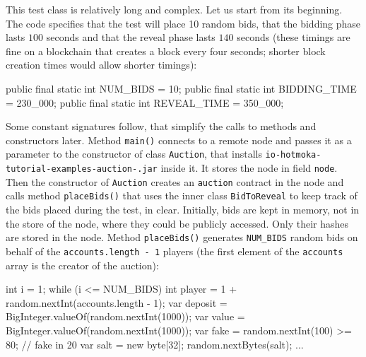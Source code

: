 This test class is relatively long and complex. Let us start from its beginning.
The code specifies that the test will place 10 random bids, that the bidding phase
lasts $100$ seconds and that the reveal phase lasts $140$ seconds
(these timings are fine on a blockchain that creates a block every four seconds;
shorter block creation times would allow shorter timings):
%
\begin{codebox}\begin{javalst}
public final static int NUM_BIDS = 10;
public final static int BIDDING_TIME = 230_000;
public final static int REVEAL_TIME = 350_000;
\end{javalst}\end{codebox}

Some constant signatures follow,
that simplify the calls to methods and constructors later.
Method \texttt{main()} connects to a remote node and passes it
as a parameter to the constructor of class \texttt{Auction}, that
installs \texttt{io-hotmoka-tutorial-examples-auction-\hotmokaVersion{}.jar} inside it.
It stores the node in field \texttt{node}.
Then the constructor of \texttt{Auction} creates an \texttt{auction} contract in the node
and calls method \texttt{placeBids()} that
uses the inner class \texttt{BidToReveal} to keep track of the bids placed
during the test, in clear. Initially, bids are kept in
memory, not in the store of the node, where they could be publicly accessed.
Only their hashes are stored in the node.
Method \texttt{placeBids()} generates \texttt{NUM\_BIDS} random bids on behalf
of the \texttt{accounts.length - 1} players (the first element of the
\texttt{accounts} array is the creator of the auction):
%
\begin{codebox}\begin{javalst}
int i = 1;
while (i <= NUM_BIDS) {
  int player = 1 + random.nextInt(accounts.length - 1);
  var deposit = BigInteger.valueOf(random.nextInt(1000));
  var value = BigInteger.valueOf(random.nextInt(1000));
  var fake = random.nextInt(100) >= 80; // fake in 20%
  var salt = new byte[32];
  random.nextBytes(salt);
  ...
}
\end{javalst}\end{codebox}

